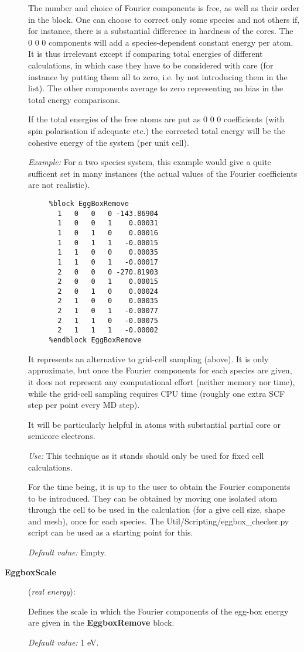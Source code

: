 \documentclass[11pt]{article}
\begin{document}
\begin{description}
The number and choice of Fourier components is free, as well as their
order in the block. One can choose to correct only some species and not
others if, for instance, there is a substantial difference in hardness
of the cores. The 0 0 0 components will add a species-dependent
constant energy per atom. It is thus irrelevant except if comparing
total energies of different calculations, in which case they 
have to be considered with care (for instance by putting them all to zero,
i.e. by not introducing them in the list). 
The other components average to zero representing no bias in the
total energy comparisons. 

If the total
energies of the free atoms are put as 0 0 0 coefficients (with
spin polarisation if adequate etc.) the corrected total energy
will be the cohesive energy of the system (per unit cell).

{\it Example:} For a two species system, this example would give a quite
sufficent set in many instances (the actual values of the Fourier 
coefficients are not realistic).

\begin{verbatim}
     %block EggBoxRemove
       1   0   0   0 -143.86904
       1   0   0   1    0.00031
       1   0   1   0    0.00016
       1   0   1   1   -0.00015
       1   1   0   0    0.00035
       1   1   0   1   -0.00017
       2   0   0   0 -270.81903
       2   0   0   1    0.00015
       2   0   1   0    0.00024
       2   1   0   0    0.00035
       2   1   0   1   -0.00077
       2   1   1   0   -0.00075
       2   1   1   1   -0.00002
     %endblock EggBoxRemove
\end{verbatim}

It represents an alternative to grid-cell sampling (above).
It is only approximate, but once the Fourier components for each 
species are given, it does not represent any computational 
effort (neither memory nor time), while the grid-cell sampling
requires CPU time (roughly one extra SCF step per point every
MD step).

It will be particularly helpful in atoms with substantial partial
core or semicore electrons.

{\it Use:} This technique as it stands should only be used for fixed cell 
calculations. 

For the time being, it is up to the user to obtain the Fourier
components to be introduced. They can be obtained by moving one
isolated atom through the cell to be used in the calculation
(for a give cell size, shape and mesh), once for each species. 
The Util/Scripting/eggbox\_checker.py script can be used as a starting
point for this.

{\it Default value:} Empty.


\item[{\bf EggboxScale}] ({\it real energy}):

Defines the scale in which the Fourier components of the 
egg-box energy are given in the {\bf EggboxRemove} block.

{\it Default value:} 1 eV.

\end{description}
\end{document}
